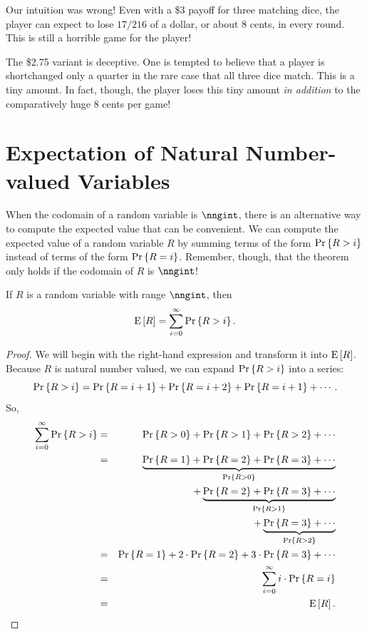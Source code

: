 \documentclass[11pt,twoside]{article}
\begin{document}
Our intuition was wrong!  Even with a \$3 payoff for three matching
dice, the player can expect to lose $17/216$ of a dollar, or
about 8 cents, in every round.  This is still a horrible game for the
player!

The \$2.75 variant is deceptive.  One is tempted to believe that a
player is shortchanged only a quarter in the rare case that all three
dice match.  This is a tiny amount.  In fact, though, the player loses
this tiny amount {\em in addition} to the comparatively huge 8 cents
per game!

\section{Expectation of Natural Number-valued Variables}

When the codomain of a random variable is $\nngint$, there is an
alternative way to compute the expected value that can be convenient.  We
can compute the expected value of a random variable $R$ by summing terms
of the form $\pr{R > i}$ instead of terms of the form $\pr{R = i}$.
Remember, though, that the theorem only holds if the codomain of $R$ is
$\nngint$!


\begin{theorem}\label{R>i}
If $R$ is a random variable with range $\nngint$, then
\[
\expect{R} = \sum_{i=0}^{\infty} \pr{R > i}.
\]
\end{theorem}

\begin{proof}
We will begin with the right-hand expression and transform it into
$\expect{R}$.  Because $R$ is natural number valued, we can expand $\pr{R
> i}$ into a series:
\[
\pr{R > i} = \pr{R = i+1} + \pr{R = i+2} + \pr{R = i+1} + \cdots.
\]
So,
\begin{eqnarray*}
\sum_{i=0}^{\infty} \pr{R > i}
        & = & \pr{R > 0} + \pr{R > 1} +  \pr{R > 2} + \cdots \\
        & = & \underbrace{\pr{R = 1} +  \pr{R = 2} + \pr{R = 3} + \cdots}_{\pr{R > 0}} \\
        &   & \qquad\qquad\quad
              +\underbrace{\pr{R = 2} + \pr{R = 3} + \cdots}_{\pr{R > 1}} \notag\\
        &   & \qquad\qquad\qquad\qquad\qquad\quad\,
	      +\underbrace{\pr{R = 3} + \cdots}_{\pr{R > 2}} \notag \\
        & = &  \pr{R = 1} + 2 \cdot \pr{R = 2} + 3 \cdot \pr{R = 3} + \cdots \\
        & = &  \sum_{i=0}^{\infty} i \cdot \pr{R = i} \\
        & = &  \expect{R}.
\end{eqnarray*}

\end{proof}
\end{document}

